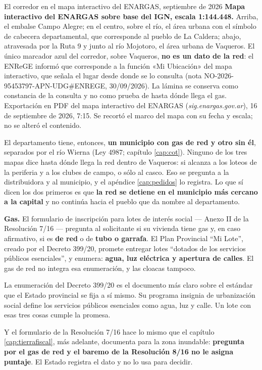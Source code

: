 %
{El corredor en el mapa interactivo del ENARGAS, septiembre de 2026}%
{\textbf{Mapa interactivo del ENARGAS sobre base del IGN, escala 1:144.448.} Arriba, el embalse Campo Alegre; en el centro, sobre el río, el área urbana con el símbolo de cabecera departamental, que corresponde al pueblo de La Caldera; abajo, atravesada por la Ruta 9 y junto al río Mojotoro, el área urbana de Vaqueros. El único marcador azul del corredor, sobre Vaqueros, \textbf{no es un dato de la red}: el ENReGE informó que corresponde a la función «Mi Ubicación» del mapa interactivo, que señala el lugar desde donde se lo consulta (nota NO-2026-95453797-APN-UDG\#ENREGE, 30/09/2026). La lámina se conserva como constancia de la consulta y no como prueba de hasta dónde llega el gas.}%
{Exportación en PDF del mapa interactivo del ENARGAS (\textit{sig.enargas.gov.ar}), 16 de septiembre de 2026, 7:15. Se recortó el marco del mapa con su fecha y escala; no se alteró el contenido.}

El departamento tiene, entonces, \textbf{un municipio con gas de red y otro sin él}, separados por el río Wierna (Ley 4987; capítulo \ref{cap:cot}). Ninguno de los tres mapas dice hasta dónde llega la red dentro de Vaqueros: si alcanza a los loteos de la periferia y a los clubes de campo, o sólo al casco. Eso se pregunta a la distribuidora y al municipio, y el apéndice \ref{cap:pedidos} lo registra. Lo que sí dicen los dos primeros es que \textbf{la red se detiene en el municipio más cercano a la capital} y no continúa hacia el pueblo que da nombre al departamento.

\textbf{Gas.} El formulario de inscripción para lotes de interés social --- Anexo II de la Resolución 7/16 --- pregunta al solicitante si su vivienda tiene gas y, en caso afirmativo, si es \textbf{de red} o de \textbf{tubo o garrafa}. El Plan Provincial ``Mi Lote'', creado por el Decreto 399/20, promete entregar lotes ``dotados de los servicios públicos esenciales'', y enumera: \textbf{agua, luz eléctrica y apertura de calles}. El gas de red no integra esa enumeración, y las cloacas tampoco.

La enumeración del Decreto 399/20 es el documento más claro sobre el estándar que el Estado provincial se fija a sí mismo. Su programa insignia de urbanización social define los servicios públicos esenciales como agua, luz y calle. Un lote con esas tres cosas cumple la promesa.

Y el formulario de la Resolución 7/16 hace lo mismo que el capítulo \ref{cap:tierrafiscal}, más adelante, documenta para la zona inundable: \textbf{pregunta por el gas de red y el baremo de la Resolución 8/16 no le asigna puntaje}. El Estado registra el dato y no lo usa para decidir.

